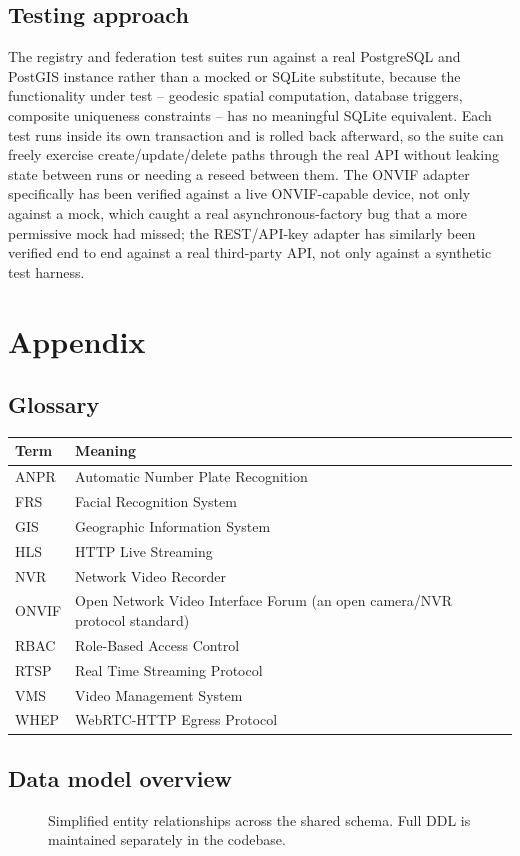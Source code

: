 \documentclass[11pt,a4paper]{article}
\begin{document}
\subsection{Testing approach}

The registry and federation test suites run against a real PostgreSQL and
PostGIS instance rather than a mocked or SQLite substitute, because the
functionality under test -- geodesic spatial computation, database
triggers, composite uniqueness constraints -- has no meaningful SQLite
equivalent. Each test runs inside its own transaction and is rolled back
afterward, so the suite can freely exercise create/update/delete paths
through the real API without leaking state between runs or needing a
reseed between them. The ONVIF adapter specifically has been verified
against a live ONVIF-capable device, not only against a mock, which caught
a real asynchronous-factory bug that a more permissive mock had missed;
the REST/API-key adapter has similarly been verified end to end against a
real third-party API, not only against a synthetic test harness.

\section{Appendix}

\subsection{Glossary}

\begin{table}[h]
\centering
\small
\begin{tabular}{ll}
\toprule
\textbf{Term} & \textbf{Meaning} \\
\midrule
ANPR & Automatic Number Plate Recognition \\
FRS & Facial Recognition System \\
GIS & Geographic Information System \\
HLS & HTTP Live Streaming \\
NVR & Network Video Recorder \\
ONVIF & Open Network Video Interface Forum (an open camera/NVR protocol standard) \\
RBAC & Role-Based Access Control \\
RTSP & Real Time Streaming Protocol \\
VMS & Video Management System \\
WHEP & WebRTC-HTTP Egress Protocol \\
\bottomrule
\end{tabular}
\end{table}

\subsection{Data model overview}

\begin{figure}[h]
\centering

\caption{Simplified entity relationships across the shared schema. Full DDL is maintained separately in the codebase.}
\end{figure}
\end{document}
